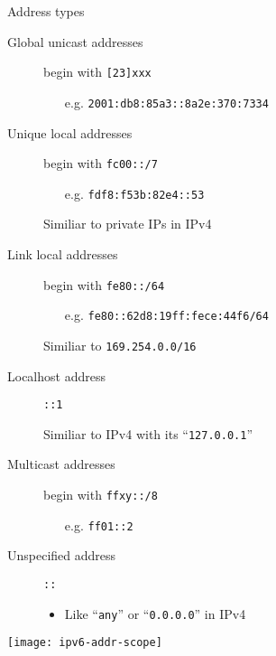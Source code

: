   
\begin{frame}{Address types}
  \begin{minipage}{.8\linewidth}
  \begin{description}
  \item[Global unicast addresses] begin with \texttt{[23]xxx}
    \begin{itemize}
    \item[e.g.] \texttt{2001:db8:85a3::8a2e:370:7334}
    \end{itemize}
  \item[Unique local addresses] begin with \texttt{fc00::/7}
    \begin{itemize}
    \item[e.g.] \texttt{fdf8:f53b:82e4::53}
    \end{itemize}
    Similiar to private IPs in IPv4
  \item[Link local addresses] begin with \texttt{fe80::/64}
    \begin{itemize}
    \item[e.g.] \texttt{fe80::62d8:19ff:fece:44f6/64}
    \end{itemize}
    Similiar to \texttt{169.254.0.0/16}
  \item[Localhost address] \texttt{::1}\par
    Similiar to IPv4 with its ``\texttt{127.0.0.1}''
  \item[Multicast addresses] begin with \texttt{ffxy::/8}
    \begin{itemize}
    \item[e.g.] \texttt{ff01::2}
    \end{itemize}
  \item[Unspecified address] \texttt{::}
    \begin{itemize}
    \item Like ``\texttt{any}'' or ``\texttt{0.0.0.0}'' in IPv4
    \end{itemize}
  \end{description}
  \end{minipage}\hfill
  \begin{minipage}{.2\linewidth}
    \texttt{[image: ipv6-addr-scope]}
  \end{minipage}
\end{frame}

